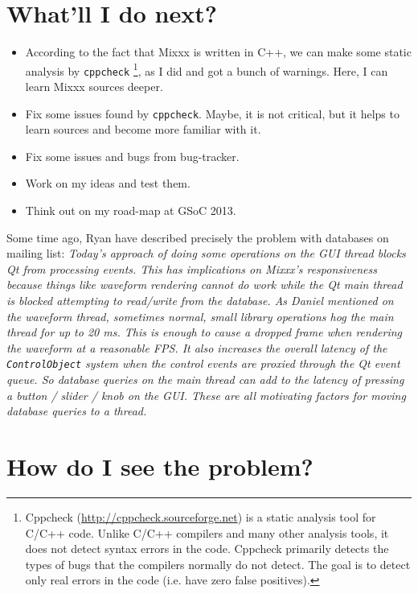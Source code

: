 \documentclass[a4paper,12pt]{scrartcl}
\begin{document}
\section{What'll I do next?}
\begin{itemize}
 \item According to the fact that Mixxx is written in C++, we can make some static analysis by 
    \texttt{cppcheck}%
    \footnote{Cppcheck (\url{http://cppcheck.sourceforge.net}) is a static analysis tool for C/C++
    code. Unlike C/C++ compilers and many other analysis tools, it does not detect syntax errors in 
    the code. Cppcheck primarily detects the types of bugs that the compilers normally do not detect. 
    The goal is to detect only real errors in the code (i.e. have zero false positives).},
 as I did and got a bunch of warnings. Here, I can learn Mixxx sources deeper.
 \item Fix some issues found by \texttt{cppcheck}. Maybe, it is not critical, but it helps to learn 
    sources and become more familiar with it.
 \item Fix some issues and bugs from bug-tracker.
 \item Work on my ideas and test them.
 \item Think out on my road-map at GSoC 2013.
\end{itemize}

Some time ago, Ryan have described precisely the problem with databases on mailing list:
\textit{ Today's approach of doing some operations on the GUI thread blocks Qt from processing events. 
This has implications on Mixxx's responsiveness because things like waveform rendering cannot do work 
while the Qt main thread is blocked attempting to read/write from the database. As Daniel mentioned on 
the waveform thread, sometimes normal, small library operations hog the main thread for up to 20 ms. 
This is enough to cause a dropped frame when rendering the waveform at a reasonable FPS. It also increases 
the overall latency of the \texttt{ControlObject} system when the control events are proxied through 
the Qt event queue. So database queries on the main thread can add to the latency of pressing a button 
/ slider / knob on the GUI. These are all motivating factors for moving database queries to a thread.}


\section{How do I see the problem?}
\end{document}
